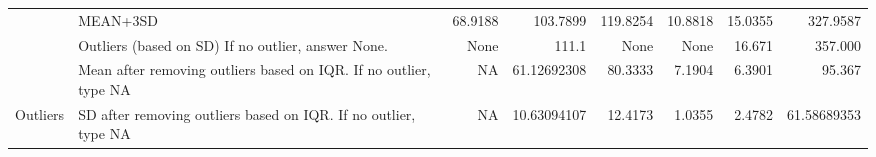 \begin{table}[ht]
\begin{adjustbox}{width = \textwidth, center}
\begin{tabular}{|cl|r|r|r|r|r|r|}
        \multicolumn{1}{|c|}{}                                         & MEAN+3SD                                                                     & 68.9188                                          & 103.7899                                                 & 119.8254                                                & 10.8818                                                          & 15.0355                                                                      & 327.9587                                                                         \\ \cline{2-8} 
        \multicolumn{1}{|c|}{}                                         & \cellcolor[HTML]{D9D2E9}Outliers (based on SD)  If no outlier, answer None.  & None                                             & 111.1                                                    & None                                                    & None                                                             & 16.671                                                                       & 357.000                                                                          \\ \cline{2-8} 
        \multicolumn{1}{|c|}{}                                         & Mean after removing outliers based on IQR. If no outlier, type NA            & NA                                               & 61.12692308                                              & 80.3333                                                 & 7.1904                                                           & 6.3901                                                                       & 95.367                                                                           \\ \cline{2-8} 
        \multicolumn{1}{|c|}{\multirow{-8}{*}{Outliers}}               & SD after removing outliers based on IQR. If no outlier, type NA              & NA                                               & 10.63094107                                              & 12.4173                                                 & 1.0355                                                           & 2.4782                                                                       & 61.58689353                                                                      \\ \hline
        \end{tabular}%
    \end{adjustbox}
\end{table}